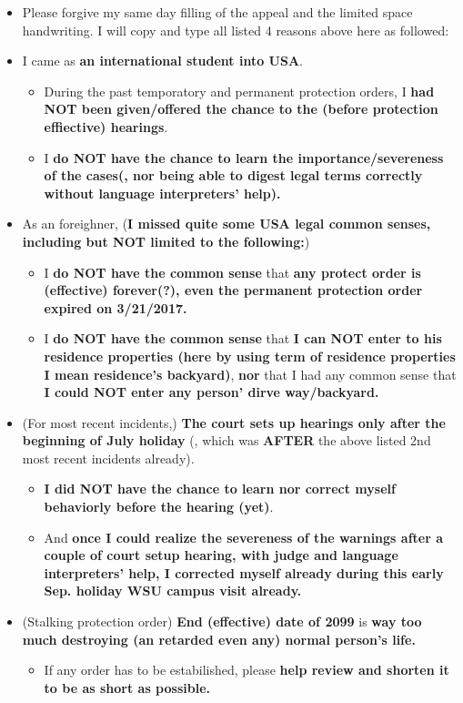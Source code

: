\documentclass[9pt, b5paper]{article}
\begin{document}
\begin{itemize}
\item Please forgive my same day filling of the appeal and the limited space handwriting. I will copy and type all listed 4 reasons above here as followed:
\item I came as \textbf{an international student into USA}. 
\begin{itemize}
\item During the past temporatory and permanent protection orders, I \textbf{had NOT been given/offered the chance to the (before protection effiective) hearings}.
\item I \textbf{do NOT have the chance to learn the importance/severeness of the cases(, nor being able to digest legal terms correctly without language interpreters' help).}
\end{itemize}
\item As an foreighner, (\textbf{I missed quite some USA legal common senses, including but NOT limited to the following:})
\begin{itemize}
\item I \textbf{do NOT have the common sense} that \textbf{any protect order is (effective) forever(?), even the permanent protection order expired on 3/21/2017.}
\item I \textbf{do NOT have the common sense} that \textbf{I can NOT enter to his residence properties (here by using term of residence properties I mean residence's backyard)}, \textbf{nor} that I had any common sense that \textbf{I could NOT enter any person' dirve way/backyard.}
\end{itemize}
\item (For most recent incidents,) \textbf{The court sets up hearings only after the beginning of July holiday} (, which was \textbf{AFTER} the above listed 2nd most recent incidents already). 
\begin{itemize}
\item \textbf{I did NOT have the chance to learn nor correct myself behaviorly before the hearing (yet)}.
\item And \textbf{once I could realize the severeness of the warnings after a couple of court setup hearing, with judge and language interpreters' help, I corrected myself already during this early Sep. holiday WSU campus visit already.}
\end{itemize}
\item (Stalking protection order) \textbf{End (effective) date of 2099} is \textbf{way too much destroying (an retarded even any) normal person's life.} 
\begin{itemize}
\item If any order has to be estabilished, please \textbf{help review and shorten it to be as short as possible.}
\end{itemize}
\end{itemize}
\end{document}
